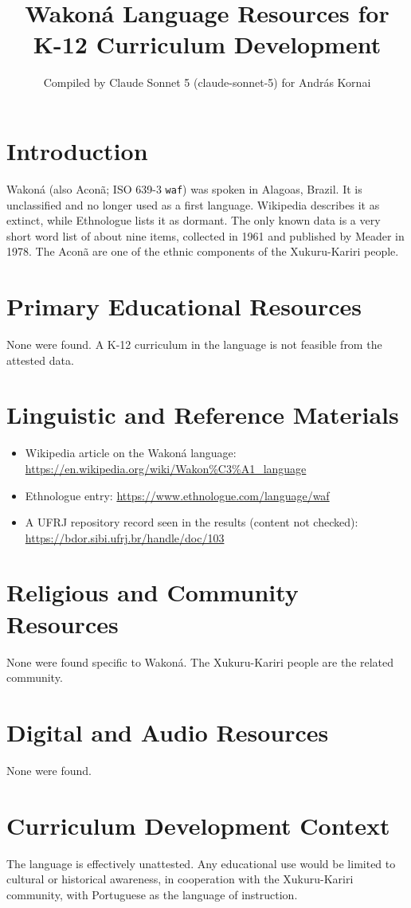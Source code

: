 \documentclass[12pt]{article}
\title{Wakon\'a Language Resources for K-12 Curriculum Development}
\author{Compiled by Claude Sonnet 5 (claude-sonnet-5) for Andr\'as Kornai}
\date{}
\begin{document}
\maketitle

\section{Introduction}
Wakon\'a (also Acon\~a; ISO 639-3 \texttt{waf}) was spoken in Alagoas, Brazil. It is unclassified and no longer used as a first language. Wikipedia describes it as extinct, while Ethnologue lists it as dormant. The only known data is a very short word list of about nine items, collected in 1961 and published by Meader in 1978. The Acon\~a are one of the ethnic components of the Xukuru-Kariri people.

\section{Primary Educational Resources}
None were found. A K-12 curriculum in the language is not feasible from the attested data.

\section{Linguistic and Reference Materials}
\begin{itemize}
\item Wikipedia article on the Wakon\'a language: \url{https://en.wikipedia.org/wiki/Wakon%C3%A1_language}
\item Ethnologue entry: \url{https://www.ethnologue.com/language/waf}
\item A UFRJ repository record seen in the results (content not checked): \url{https://bdor.sibi.ufrj.br/handle/doc/103}
\end{itemize}

\section{Religious and Community Resources}
None were found specific to Wakon\'a. The Xukuru-Kariri people are the related community.

\section{Digital and Audio Resources}
None were found.

\section{Curriculum Development Context}
The language is effectively unattested. Any educational use would be limited to cultural or historical awareness, in cooperation with the Xukuru-Kariri community, with Portuguese as the language of instruction.
\end{document}
